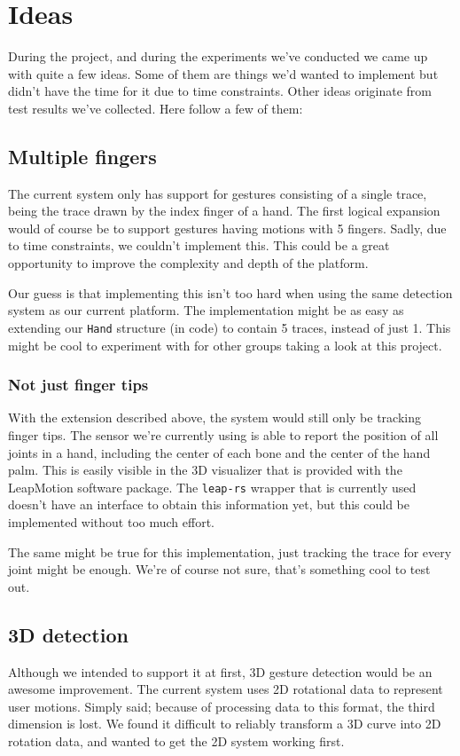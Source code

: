 \documentclass[a4paper]{article}
\begin{document}
  \clearpage

  \section*{Ideas}
  During the project, and during the experiments we've conducted we came up with
  quite a few ideas. Some of them are things we'd wanted to implement but didn't
  have the time for it due to time constraints. Other ideas originate from
  test results we've collected.
  Here follow a few of them:

  \subsection*{Multiple fingers}
  The current system only has support for gestures consisting of a single trace,
  being the trace drawn by the index finger of a hand. The first logical
  expansion would of course be to support gestures having motions with 5
  fingers. Sadly, due to time constraints, we couldn't implement this.
  This could be a great opportunity to improve the complexity and depth of the platform.

  Our guess is that implementing this isn't too hard when using the same
  detection system as our current platform. The implementation might be as easy
  as extending our \verb_Hand_ structure (in code) to contain 5 traces, instead
  of just 1. This might be cool to experiment with for other groups taking a
  look at this project.

  \subsubsection*{Not just finger tips}
  With the extension described above, the system would still only be tracking
  finger tips. The sensor we're currently using is able to report the position
  of all joints in a hand, including the center of each bone and the center of
  the hand palm. This is easily visible in the 3D visualizer that is provided
  with the LeapMotion software package. The \verb_leap-rs_ wrapper that is
  currently used doesn't have an interface to obtain this information yet,
  but this could be implemented without too much effort.

  The same might be true for this implementation, just tracking the trace for
  every joint might be enough. We're of course not sure, that's something cool
  to test out.

  \subsection*{3D detection}
  Although we intended to support it at first, 3D gesture detection would be an
  awesome improvement. The current system uses 2D rotational data to represent
  user motions. Simply said; because of processing data to this format, the
  third dimension is lost. We found it difficult to reliably transform a 3D
  curve into 2D rotation data, and wanted to get the 2D system working first.
\end{document}
